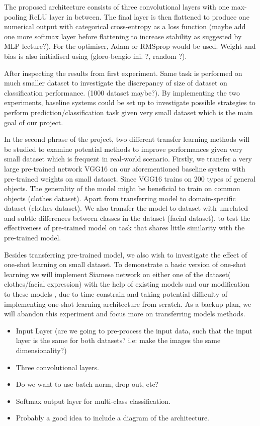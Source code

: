 \documentclass{article}
\begin{document}
The proposed architecture consists of three convolutional layers with one max-pooling ReLU layer in between. The final layer is then flattened to produce one numerical output with categorical cross-entropy as a loss function (maybe add one more softmax layer before flattening to increase stability as suggested by MLP lecture?). For the optimiser, Adam or RMSprop would be used. Weight and bias is also initialised using (gloro-bengio ini. ?, random ?). 

After inspecting the results from first experiment. Same task is performed on much smaller dataset to investigate the discrepancy of size of dataset on classification performance. (1000 dataset maybe?). By implementing the two experiments, baseline systems could be set up to investigate possible strategies to perform prediction/classification task given very small dataset which is the main goal of our project.

In the second phrase of the project, two different transfer learning methods will be studied to examine potential methods to improve performances given very small dataset which is frequent in real-world scenario. Firstly, we transfer a very large pre-trained network VGG16 on our aforementioned baseline system with pre-trained weights on small dataset. Since VGG16 trains on 200 types of general objects. The generality of the model might be beneficial to train on common objects (clothes dataset). Apart from transferring model to domain-specific dataset (clothes dataset). We also transfer the model to dataset with unrelated and subtle differences between classes in the dataset (facial dataset), to test the effectiveness of pre-trained model on task that shares little similarity with the pre-trained model. 

Besides transferring pre-trained model, we also wish to investigate the effect of one-shot learning on small dataset. To demonstrate a basic version of one-shot learning we will implement Siamese network on either one of the dataset( clothes/facial expression) with the help of existing models and our modification to these models , due to time constrain and taking potential difficulty of implementing one-shot learning architecture from scratch. As a backup plan, we will abandon this experiment and focus more on transferring models methods.

\begin{itemize}
  \item Input Layer (are we going to pre-process the input data, such that the input layer is the same for both datasets? i.e: make the images the same dimensionality?)
  \item Three convolutional layers.
  \item Do we want to use batch norm, drop out, etc?
  \item Softmax output layer for multi-class classification.
  \item Probably a good idea to include a diagram of the architecture.
\end{itemize}
\end{document}
